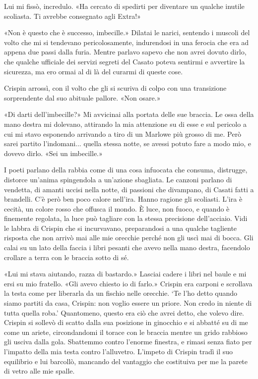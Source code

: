 Lui mi fissò, incredulo. «Ha cercato di spedirti per diventare un
qualche inutile scoliasta. Ti avrebbe consegnato agli Extra!»

«Non è questo che è successo, imbecille.» Dilatai le narici, sentendo i
muscoli del volto che mi si tendevano pericolosamente, indurendosi in
una ferocia che era ad appena due passi dalla furia. Mentre parlavo
sapevo che non avrei dovuto dirlo, che qualche ufficiale dei servizi
segreti del Casato poteva sentirmi e avvertire la sicurezza, ma ero
ormai al di là del curarmi di queste cose.

Crispin arrossì, con il volto che gli si scuriva di colpo con una
transizione sorprendente dal suo abituale pallore. «Non osare.»

«Di darti dell'imbecille?» Mi avvicinai alla portata delle sue braccia.
Le ossa della mano destra mi dolevano, attirando la mia attenzione su di
esse e sul pericolo a cui mi stavo esponendo arrivando a tiro di un
Marlowe più grosso di me. Però sarei partito l'indomani... quella stessa
notte, se avessi potuto fare a modo mio, e dovevo dirlo. «Sei un
imbecille.»

I poeti parlano della rabbia come di una cosa infuocata che consuma,
distrugge, distorce un'anima spingendola a un'azione sbagliata. Le
canzoni parlano di vendetta, di amanti uccisi nella notte, di passioni
che divampano, di Casati fatti a brandelli. C'è però ben poco calore
nell'ira. Hanno ragione gli scoliasti. L'ira è cecità, un colore rosso
che offusca il mondo. È luce, non fuoco, e quando è finemente regolata,
la luce può tagliare con la stessa precisione dell'acciaio. Vidi le
labbra di Crispin che si incurvavano, preparandosi a una qualche
tagliente risposta che non arrivò mai alle mie orecchie perché non gli
uscì mai di bocca. Gli calai su un lato della faccia i libri pesanti che
avevo nella mano destra, facendolo crollare a terra con le braccia sotto
di sé.

«Lui mi stava aiutando, razza di bastardo.» Lasciai cadere i libri nel
baule e mi ersi su mio fratello. «Gli avevo chiesto io di farlo.»
Crispin era carponi e scrollava la testa come per liberarla da un
fischio nelle orecchie. `Te l'ho detto quando siamo partiti da casa,
Crispin: non voglio essere un priore. Non credo in niente di tutta
quella roba.' Quantomeno, questo era ciò che avrei detto, che volevo
dire. Crispin si sollevò di scatto dalla sua posizione in ginocchio e si
abbatté su di me come un ariete, circondandomi il torace con le braccia
mentre un grido rabbioso gli usciva dalla gola. Sbattemmo contro
l'enorme finestra, e rimasi senza fiato per l'impatto della mia testa
contro l'alluvetro. L'impeto di Crispin tradì il suo equilibrio e lui
barcollò, mancando del vantaggio che costituiva per me la parete di
vetro alle mie spalle.

